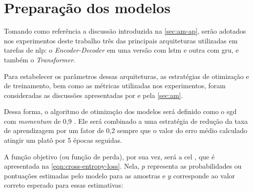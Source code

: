 \section{Preparação dos modelos}
\label{sec:metodos-preparacao-modelos}






Tomando como referência a discussão introduzida na \autoref{sec:am-ap}, serão adotados nos experimentos deste trabalho três das principais arquiteturas utilizadas em tarefas de \acrfull{nlp}: o \textit{Encoder-Decoder} em uma versão com \acrfull{lstm} e outra com \acrfull{gru}, e também o \textit{Transformer}.


Para estabelecer os parâmetros dessas arquiteturas, as estratégias de otimização e de treinamento, bem como as métricas utilizadas nos experimentos, foram consideradas as discussões apresentadas por  e pela \autoref{sec:am}.

Dessa forma, o algoritmo de otimização dos modelos será definido como o \acrfull{sgd} com \textit{momentum} de 0,9 \cite{robbins-2007-stochastic}. Ele será combinado a uma estratégia de redução da taxa de aprendizagem por um fator de 0,2 sempre que o valor do erro médio calculado atingir um platô por 5 épocas seguidas.

A função objetivo (ou função de perda), por sua vez, será a \acrfull{cel} \cite{mitchell-1997-ml}, que é apresentada na \autoref{eqn:cross-entropy-loss}. Nela, \(p\) representa as probabilidades ou pontuações estimadas pelo modelo para as amostras e \(y\) corresponde ao valor correto esperado para essas estimativas:

